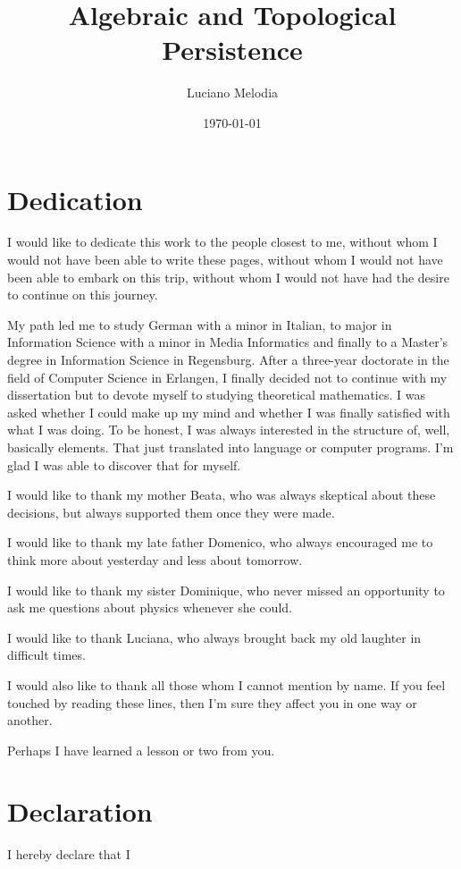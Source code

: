 \documentclass[b5paper, 11pt, twoside]{report}
\title{Algebraic and Topological Persistence}
\author{Luciano Melodia}
\date{\today}
\begin{document}
	
	

	\chapter*{Dedication}

	I would like to dedicate this work to the people closest to me, without whom I
	would not have been able to write these pages, without whom I would not have
	been able to embark on this trip, without whom I would not have had the desire
	to continue on this journey.

	My path led me to study German with a minor in Italian, to major in
	Information Science with a minor in Media Informatics and finally to a Master's
	degree in Information Science in Regensburg. After a three-year doctorate in the
	field of Computer Science in Erlangen, I finally decided not to continue with
	my dissertation but to devote myself to studying theoretical mathematics. I was
	asked whether I could make up my mind and whether I was finally satisfied with
	what I was doing. To be honest, I was always interested in the structure of,
	well, basically elements. That just translated into language or computer
	programs. I'm glad I was able to discover that for myself.

	I would like to thank my mother Beata, who was always skeptical about these
	decisions, but always supported them once they were made.

	I would like to thank my late father Domenico, who always encouraged me to
	think more about yesterday and less about tomorrow.

	I would like to thank my sister Dominique, who never missed an opportunity to ask
	me questions about physics whenever she could.

	I would like to thank Luciana, who always brought back my old laughter in
	difficult times.

	I would also like to thank all those whom I cannot mention by name. If you feel
	touched by reading these lines, then I'm sure they affect you in one way or
	another.

	Perhaps I have learned a lesson or two from you.

	\chapter*{Declaration}

	I hereby declare that I
\end{document}
